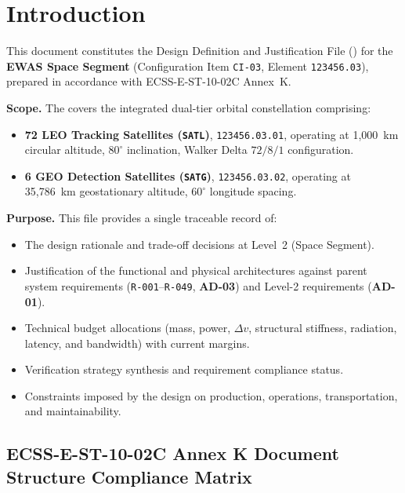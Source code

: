 \section{Introduction}
\label{sec:introduction}

This document constitutes the Design Definition and Justification File () for the \textbf{EWAS Space Segment} (Configuration Item \texttt{CI-03},  Element \texttt{123456.03}), prepared in accordance with ECSS-E-ST-10-02C Annex~K.

\textbf{Scope.} The  covers the integrated dual-tier orbital constellation comprising:
\begin{itemize}
    \item \textbf{72 LEO Tracking Satellites (\texttt{SATL})},  \texttt{123456.03.01}, operating at 1,000~km circular altitude, $80^\circ$ inclination, Walker Delta $72/8/1$ configuration.
    \item \textbf{6 GEO Detection Satellites (\texttt{SATG})},  \texttt{123456.03.02}, operating at 35,786~km geostationary altitude, $60^\circ$ longitude spacing.
\end{itemize}

\textbf{Purpose.} This file provides a single traceable record of:
\begin{itemize}
    \item The design rationale and trade-off decisions at  Level~2 (Space Segment).
    \item Justification of the functional and physical architectures against parent system requirements (\texttt{R-001}--\texttt{R-049}, \textbf{AD-03}) and Level-2 requirements (\textbf{AD-01}).
    \item Technical budget allocations (mass, power, $\Delta v$, structural stiffness, radiation, latency, and bandwidth) with current margins.
    \item Verification strategy synthesis and requirement compliance status.
    \item Constraints imposed by the design on production, operations, transportation, and maintainability.
\end{itemize}

\subsection{ECSS-E-ST-10-02C Annex K Document Structure Compliance Matrix}

